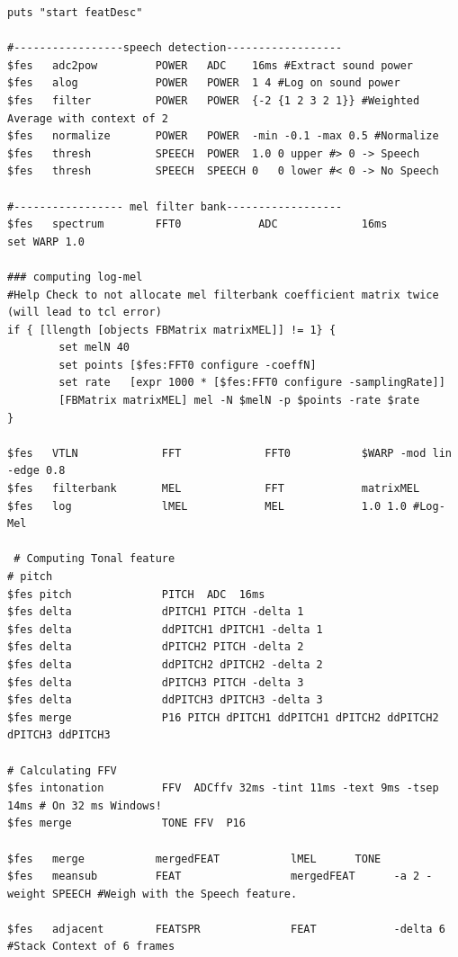 \begin{lstlisting}[label=lst:features,caption=The feature description as used by our pre-DBNF-preprocessing]
puts "start featDesc"

#-----------------speech detection------------------
$fes   adc2pow         POWER   ADC    16ms #Extract sound power
$fes   alog            POWER   POWER  1 4 #Log on sound power
$fes   filter          POWER   POWER  {-2 {1 2 3 2 1}} #Weighted Average with context of 2
$fes   normalize       POWER   POWER  -min -0.1 -max 0.5 #Normalize
$fes   thresh          SPEECH  POWER  1.0 0 upper #> 0 -> Speech
$fes   thresh          SPEECH  SPEECH 0   0 lower #< 0 -> No Speech

#----------------- mel filter bank------------------
$fes   spectrum        FFT0            ADC             16ms
set WARP 1.0
        
### computing log-mel
#Help Check to not allocate mel filterbank coefficient matrix twice (will lead to tcl error)
if { [llength [objects FBMatrix matrixMEL]] != 1} {
        set melN 40
        set points [$fes:FFT0 configure -coeffN]
        set rate   [expr 1000 * [$fes:FFT0 configure -samplingRate]]
        [FBMatrix matrixMEL] mel -N $melN -p $points -rate $rate
}

$fes   VTLN             FFT             FFT0           $WARP -mod lin -edge 0.8
$fes   filterbank       MEL             FFT            matrixMEL
$fes   log              lMEL            MEL            1.0 1.0 #Log-Mel

 # Computing Tonal feature
# pitch
$fes pitch              PITCH  ADC  16ms
$fes delta              dPITCH1 PITCH -delta 1
$fes delta              ddPITCH1 dPITCH1 -delta 1
$fes delta              dPITCH2 PITCH -delta 2
$fes delta              ddPITCH2 dPITCH2 -delta 2
$fes delta              dPITCH3 PITCH -delta 3
$fes delta              ddPITCH3 dPITCH3 -delta 3
$fes merge              P16 PITCH dPITCH1 ddPITCH1 dPITCH2 ddPITCH2 dPITCH3 ddPITCH3

# Calculating FFV
$fes intonation         FFV  ADCffv 32ms -tint 11ms -text 9ms -tsep 14ms # On 32 ms Windows!
$fes merge              TONE FFV  P16

$fes   merge           mergedFEAT           lMEL      TONE
$fes   meansub         FEAT                 mergedFEAT      -a 2 -weight SPEECH #Weigh with the Speech feature.

$fes   adjacent        FEATSPR              FEAT            -delta 6 #Stack Context of 6 frames
\end{lstlisting}

